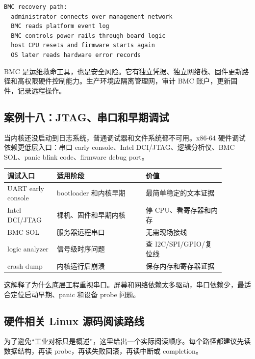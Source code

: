\begin{lstlisting}
BMC recovery path:
  administrator connects over management network
  BMC reads platform event log
  BMC controls power rails through board logic
  host CPU resets and firmware starts again
  OS later reads hardware error records
\end{lstlisting}

BMC 是运维救命工具，也是安全风险。它有独立凭据、独立网络栈、固件更新路径和高权限硬件控制能力。生产环境应隔离管理网，审计 BMC 账户，更新固件，记录远程操作。

\subsection{案例十八：JTAG、串口和早期调试}

当内核还没启动到日志系统，普通调试器和文件系统都不可用。x86-64 硬件调试依赖更低层入口：串口 early console、Intel DCI/JTAG、逻辑分析仪、BMC SOL、panic blink code、firmware debug port。

\begin{longtable}{p{0.2\linewidth}p{0.36\linewidth}p{0.32\linewidth}}
\toprule
调试入口 & 适用阶段 & 价值 \\
\midrule
UART early console & bootloader 和内核早期 & 最简单稳定的文本证据 \\
Intel DCI/JTAG & 裸机、固件和早期内核 & 停 CPU、看寄存器和内存 \\
BMC SOL & 服务器远程串口 & 无需现场接线 \\
logic analyzer & 信号级时序问题 & 查 I2C/SPI/GPIO/复位线 \\
crash dump & 内核运行后崩溃 & 保存内存和寄存器证据 \\
\bottomrule
\end{longtable}

这解释了为什么底层工程重视串口。屏幕和网络依赖太多驱动，串口依赖少，最适合定位启动早期、panic 和设备 probe 问题。

\subsection{硬件相关 Linux 源码阅读路线}

为了避免“工业对标只是概述”，这里给出一个实际阅读顺序。每个路径都建议先读数据结构，再读 probe，再读失败回滚，再读中断或 completion。

